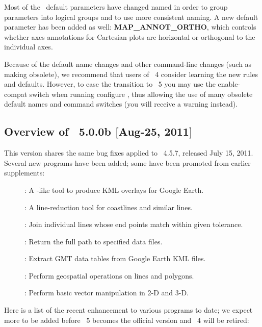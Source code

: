 Most of the \GMT\ default parameters have changed named in order to group parameters into logical groups
and to use more consistent naming.  A new default parameter has been added as well:
\textbf{MAP\_ANNOT\_ORTHO}, which controls whether axes annotations for Cartesian plots are horizontal or
orthogonal to the individual axes.

Because of the default name changes and other command-line changes (such as making  obsolete), we
recommend that users of \GMT\ 4 consider learning the new rules and defaults.  However, to ease the
transition to \GMT\ 5 you may use the \-\-enable-compat switch when running configure , thus allowing the use
of many obsolete default names and command switches (you will receive a warning instead).

\subsection{Overview of \gmt\ 5.0.0b [Aug-25, 2011]}

This version shares the same bug fixes applied to \GMT\ 4.5.7, released July 15, 2011.
Several new programs have been added; some have been promoted from earlier supplements:

\begin{description}
	\item []: A -like tool to produce KML overlays for Google Earth.
	\item []: A line-reduction tool for coastlines and similar lines.
	\item []: Join individual lines whose end points match within given tolerance.
	\item []: Return the full path to specified data files.
	\item []: Extract GMT data tables from Google Earth KML files.
	\item []: Perform geospatial operations on lines and polygons.
	\item []: Perform basic vector manipulation in 2-D and 3-D.
\end{description}

Here is a list of the recent enhancement to various programs to date; we expect more to be added
before \GMT\ 5 becomes the official version and \GMT\ 4 will be retired:

